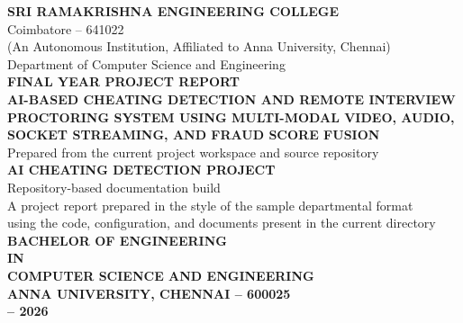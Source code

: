 \documentclass[12pt,a4paper]{extreport}
\begin{document}
\begin{titlepage}
\begin{center}
\vspace*{0.7cm}
{\bfseries\fontsize{18}{20}\selectfont SRI RAMAKRISHNA ENGINEERING COLLEGE}\\[0.25cm]
{\fontsize{12}{14}\selectfont Coimbatore -- 641022}\\[0.15cm]
{\fontsize{12}{14}\selectfont (An Autonomous Institution, Affiliated to Anna University, Chennai)}\\[0.15cm]
{\fontsize{12}{14}\selectfont Department of Computer Science and Engineering}\\[1.4cm]

{\bfseries\fontsize{16}{18}\selectfont FINAL YEAR PROJECT REPORT}\\[0.9cm]

{\bfseries\fontsize{16}{18}\selectfont AI-BASED CHEATING DETECTION AND REMOTE INTERVIEW}\\[0.2cm]
{\bfseries\fontsize{16}{18}\selectfont PROCTORING SYSTEM USING MULTI-MODAL VIDEO, AUDIO,}\\[0.2cm]
{\bfseries\fontsize{16}{18}\selectfont SOCKET STREAMING, AND FRAUD SCORE FUSION}\\[1.3cm]

{\fontsize{12}{14}\selectfont Prepared from the current project workspace and source repository}\\[0.6cm]
{\bfseries\fontsize{14}{16}\selectfont AI CHEATING DETECTION PROJECT}\\
{\fontsize{12}{14}\selectfont Repository-based documentation build}\\[1.1cm]

{\fontsize{12}{14}\selectfont A project report prepared in the style of the sample departmental format}\\
{\fontsize{12}{14}\selectfont using the code, configuration, and documents present in the current directory}\\[0.45cm]
{\bfseries\fontsize{14}{16}\selectfont BACHELOR OF ENGINEERING}\\
{\bfseries\fontsize{14}{16}\selectfont IN}\\
{\bfseries\fontsize{14}{16}\selectfont COMPUTER SCIENCE AND ENGINEERING}\\[1.0cm]

{\bfseries\fontsize{14}{16}\selectfont ANNA UNIVERSITY, CHENNAI -- 600025}\\[1.0cm]
{\bfseries\fontsize{14}{16} -- 2026}
\end{center}
\end{titlepage}
\end{document}
